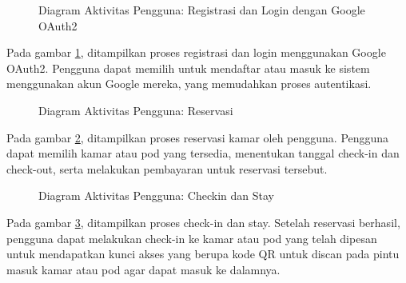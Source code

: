 \begin{figure}[H] %
    \centering
    \caption{Diagram Aktivitas Pengguna: Registrasi dan Login dengan Google OAuth2}
    \label{fig:ad_user_registration_google} %
\end{figure}

Pada gambar \ref{fig:ad_user_registration_google}, ditampilkan proses registrasi dan login menggunakan Google OAuth2. Pengguna dapat memilih untuk mendaftar atau masuk ke sistem menggunakan akun Google mereka, yang memudahkan proses autentikasi.

\begin{figure}[H] %
    \centering
    \caption{Diagram Aktivitas Pengguna: Reservasi}
    \label{fig:ad_user_reservation} %
\end{figure}

Pada gambar \ref{fig:ad_user_reservation}, ditampilkan proses reservasi kamar oleh pengguna. Pengguna dapat memilih kamar atau pod yang tersedia, menentukan tanggal check-in dan check-out, serta melakukan pembayaran untuk reservasi tersebut.

\begin{figure}[H] %
    \centering
    \caption{Diagram Aktivitas Pengguna: Checkin dan Stay}
    \label{fig:ad_user_stay} %
\end{figure}

Pada gambar \ref{fig:ad_user_stay}, ditampilkan proses check-in dan stay. Setelah reservasi berhasil, pengguna dapat melakukan check-in ke kamar atau pod yang telah dipesan untuk mendapatkan kunci akses yang berupa kode QR untuk discan pada pintu masuk kamar atau pod agar dapat masuk ke dalamnya.


